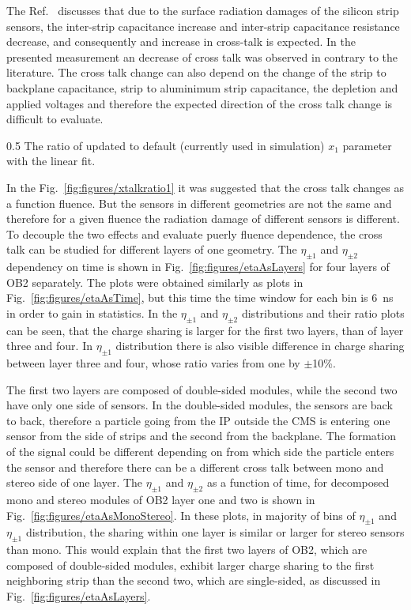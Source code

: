 The Ref.~\cite{Hartmann:2017gzy} discusses that due to the surface radiation damages of the silicon strip sensors, the inter-strip capacitance increase and inter-strip capacitance resistance decrease, and consequently and increase in cross-talk is expected. In the presented measurement an decrease of cross talk was observed in  contrary to the literature. The cross talk change can also depend on the change of the strip to backplane capacitance, strip to aluminimum strip capacitance, the depletion and applied voltages and therefore the expected direction of the cross talk change is difficult to evaluate.

                 {0.5}       %
                 {The ratio of updated to default (currently used in simulation) $x_{1}$ parameter with the linear fit.}


In the Fig.~\ref{fig:figures/xtalkratio1} it was suggested that the cross talk changes as a function fluence. But the sensors in different geometries are not the same and therefore for a given fluence the radiation damage of different sensors is different. To decouple the two effects and evaluate puerly fluence dependence, the cross talk can be studied for different layers of one geometry. The $\eta_{\pm 1}$ and $\eta_{\pm 2}$ dependency on time is shown in Fig.~\ref{fig:figures/etaAsLayers} for four layers of OB2 separately. The plots were obtained similarly as plots in Fig.~\ref{fig:figures/etaAsTime}, but this time the time window for each bin is 6~ns in order to gain in statistics. In the $\eta_{\pm 1}$ and $\eta_{\pm 2}$ distributions and their ratio plots can be seen, that the charge sharing is larger for the first two layers, than of layer three and four. In  $\eta_{\pm 1}$ distribution there is also visible difference in charge sharing between layer three and four, whose ratio varies from one by $\pm$10\%. 

The first two layers are composed of double-sided modules, while the second two have only one side of sensors. In the double-sided modules, the sensors are back to back, therefore a particle going from the IP outside the CMS is entering one sensor from the side of strips and the second from the backplane. The formation of the signal could be different depending on from which side the particle enters the sensor and therefore there can be a different cross talk between mono and stereo side of one layer. The $\eta_{\pm 1}$ and $\eta_{\pm 2}$ as a function of time, for decomposed mono and stereo modules of OB2 layer one and two is shown in Fig.~\ref{fig:figures/etaAsMonoStereo}. In these plots, in majority of bins of $\eta_{\pm 1}$ and $\eta_{\pm 1}$  distribution, the sharing within one layer is similar or larger for stereo sensors than mono. This would explain that the first two layers of OB2, which are composed of double-sided modules, exhibit larger charge sharing to the first neighboring strip than the second two, which are single-sided, as discussed in Fig.~\ref{fig:figures/etaAsLayers}. 

